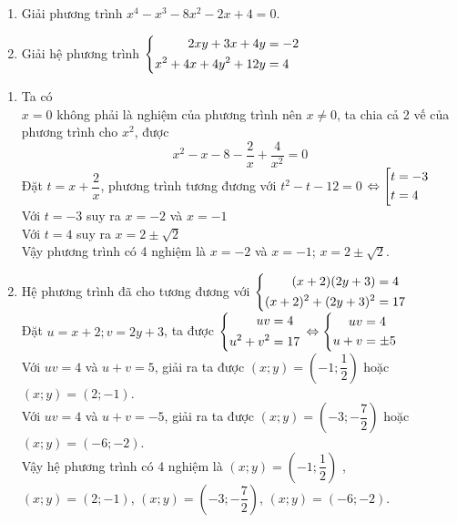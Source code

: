 \begin{ex}%
\hfill
    \begin{enumerate}    
        \item Giải phương trình $x^4-x^3-8x^2-2x+4=0$.
        \item Giải hệ phương trình $\left\{\begin{aligned}2xy+3x+4y&=-2\\x^2+4x+4y^2+12y&=4\end{aligned}\right.$
    \end{enumerate}
\loigiai
    {
    \begin{enumerate}
        \item Ta có \\
        $x=0$ không phải là nghiệm của phương trình nên $x \ne 0$, ta chia cả 2 vế của phương trình cho $x^2$, được
        $$x^2-x-8-\dfrac{2}{x}+\dfrac{4}{x^2}=0$$
        Đặt $t=x+\dfrac{2}{x}$, phương trình tương đương với $t^2-t-12=0$ $\Leftrightarrow \left[\begin{aligned}t&=-3\\t&=4\end{aligned}\right.$\\
        Với $t=-3$ suy ra $x=-2$ và $x=-1$\\
        Với $t=4$ suy ra $x=2\pm \sqrt{2}$\\
        Vậy phương trình có 4 nghiệm là $x=-2$ và $x=-1$;  $x=2\pm \sqrt{2}$.
        \item Hệ phương trình đã cho tương đương với $\left\{\begin{aligned}(x+2)(2y+3)&=4\\(x+2)^2+(2y+3)^2&=17\end{aligned}\right.$\\
        Đặt $u=x+2; v=2y+3$, ta được $\left\{\begin{aligned}uv&=4\\u^2+v^2&=17\end{aligned}\right.$ $\Leftrightarrow \left\{\begin{aligned}uv&=4\\u+v&=\pm 5\end{aligned}\right.$\\
        Với $uv=4$ và $u+v=5$, giải ra ta được $(x;y)=\left(-1;\dfrac{1}{2}\right)$ hoặc $(x;y)=(2;-1)$.\\
        Với $uv=4$ và $u+v=-5$, giải ra ta được $(x;y)=\left(-3;-\dfrac{7}{2}\right)$ hoặc $(x;y)=(-6;-2)$.\\
        Vậy hệ phương trình có 4 nghiệm là  $(x;y)=\left(-1;\dfrac{1}{2}\right)$ , $(x;y)=(2;-1)$, $(x;y)=\left(-3;-\dfrac{7}{2}\right)$, $(x;y)=(-6;-2)$.
    \end{enumerate}
    }
\end{ex}

